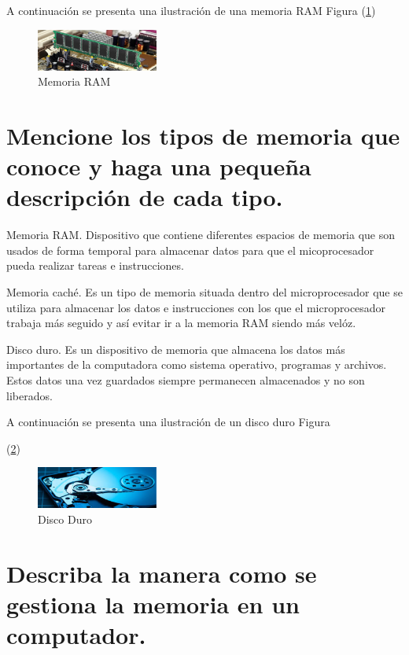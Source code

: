 \documentclass{article}
\begin{document}
\vspace{0.5cm}

A continuación se presenta una ilustración de una memoria RAM Figura
(\ref{fig:memoriaRAM})
\begin{figure}[h]
\includegraphics[width=4cm]{memoriaRAM.png}
\centering
\caption{Memoria RAM}
\label{fig:memoriaRAM}
\end{figure}


\section{Mencione los tipos de memoria que conoce y haga una pequeña descripción de cada tipo.}

Memoria RAM. Dispositivo que contiene diferentes espacios de memoria que son usados de forma temporal para almacenar datos para que el  micoprocesador pueda realizar tareas e instrucciones.

\vspace{0.5cm}

Memoria caché. Es un tipo de memoria situada dentro del microprocesador que se utiliza para almacenar los datos e instrucciones con los que el microprocesador trabaja más seguido y así evitar ir a la memoria RAM siendo más velóz. 

\vspace{0.5cm}

Disco duro. Es un dispositivo de memoria que almacena los datos más importantes de la computadora como sistema operativo, programas y archivos. Estos datos una vez guardados siempre permanecen almacenados y no son liberados. \cite{GCFglobal}

\vspace{0.5cm}

A continuación se presenta una ilustración de un disco duro Figura

(\ref{fig:DiscoDuro})
\begin{figure}[h]
\includegraphics[width=4cm]{DiscoDuro.png}
\centering
\caption{Disco Duro}
\label{fig:DiscoDuro}
\end{figure}

\section{Describa la manera como se gestiona la memoria en un computador.}
\end{document}
